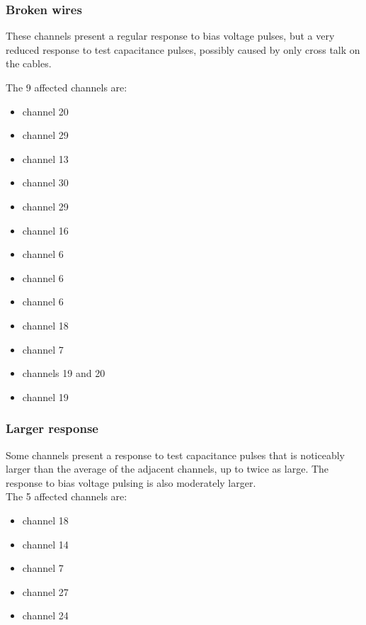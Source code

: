 \subsubsection{Broken wires}
\label{sssec:BrokenWires}

These channels present a regular response to bias voltage pulses, but a very
reduced response to test capacitance pulses, possibly caused by only cross talk
on the cables.

The 9 affected channels are:
\begin{itemize}
  \item {}  channel 20
  \item {}  channel 29
  \item {}  channel 13
  \item {}  channel 30
  \item {}  channel 29
  \item {}  channel 16
  \item {}  channel  6
  \item {}  channel  6
  \item {}  channel  6
  \item {}  channel 18
  \item {}  channel  7
  \item {}  channels 19 and 20
  \item {}  channel  19
\end{itemize}


\subsubsection{Larger response}
\label{sssec:LargerResponse}

Some channels present a response to test capacitance pulses that is noticeably
larger than the average of the adjacent channels, up to twice as large.
The response to bias voltage pulsing is also moderately larger.
\\
The 5 affected channels are:
\begin{itemize}
  \item {}  channel 18
  \item {}  channel 14
  \item {}  channel  7
  \item {}  channel 27
  \item {}  channel 24
\end{itemize}


